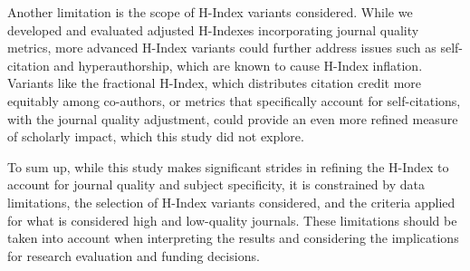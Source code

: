 Another limitation is the scope of H-Index variants considered. While we
developed and evaluated adjusted H-Indexes incorporating journal quality
metrics, more advanced H-Index variants could further address issues such as
self-citation and hyperauthorship, which are known to cause H-Index inflation.
Variants like the fractional H-Index, which distributes citation credit more
equitably among co-authors, or metrics that specifically account for
self-citations, with the journal quality adjustment, could provide an even more
refined measure of scholarly impact, which this study did not explore.

To sum up, while this study makes significant strides in refining the H-Index
to account for journal quality and subject specificity, it is constrained by
data limitations, the selection of H-Index variants considered, and the
criteria applied for what is considered high and low-quality journals. These
limitations should be taken into account when interpreting the results and
considering the implications for research evaluation and funding decisions.
